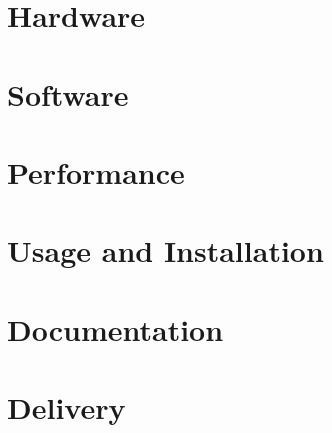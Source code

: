 \documentclass[10pt, a4paper, twoside]{article}
\numberwithin{equation}{subsection}
\numberwithin{figure}{section}
\numberwithin{table}{section}
\begin{document}
\newpage
\section{Hardware}
\label{sec:hardware}


\newpage
\section{Software}
\label{sec:software}


\newpage
\section{Performance}
\label{sec:performance}


\newpage
\section{Usage and Installation}
\label{sec:usage}


\newpage
\section{Documentation}
\label{sec:documentation}


\newpage
\section{Delivery}
\label{sec:delivery}



%
%


%
\end{document}

